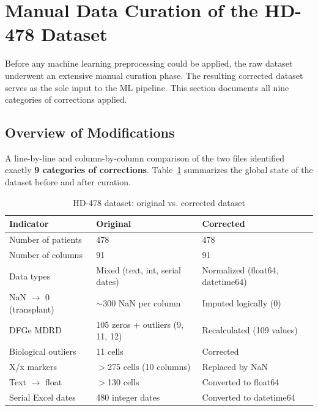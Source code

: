 \documentclass[12pt,a4paper,twoside]{report}
\begin{document}
\section{Manual Data Curation of the HD-478 Dataset}
\label{sec:manual_curation}

Before any machine learning preprocessing could be applied, the raw dataset underwent an extensive manual curation phase. The resulting corrected dataset serves as the sole input to the ML pipeline. This section documents all nine categories of corrections applied.

\subsection{Overview of Modifications}

A line-by-line and column-by-column comparison of the two files identified exactly \textbf{9 categories of corrections}. Table~\ref{tab:preprocess_summary} summarizes the global state of the dataset before and after curation.

\begin{table}[htbp]
\centering
\caption{HD-478 dataset: original vs. corrected dataset}
\label{tab:preprocess_summary}
\begin{tabularx}{\textwidth}{p{4.5cm}Xp{4cm}}
\toprule
\textbf{Indicator} & \textbf{Original} & \textbf{Corrected} \\
\midrule
Number of patients         & 478                                & 478 \\
Number of columns          & 91                                 & 91 \\
Data types                 & Mixed (text, int, serial dates)    & Normalized (float64, datetime64) \\
NaN $\to$ 0 (transplant)   & $\sim$300 NaN per column           & Imputed logically (0) \\
DFGe MDRD                  & 105 zeros + outliers (9, 11, 12)  & Recalculated (109 values) \\
Biological outliers        & 11 cells                           & Corrected \\
X/x markers                & $>$275 cells (10 columns)          & Replaced by NaN \\
Text $\to$ float           & $>$130 cells                       & Converted to float64 \\
Serial Excel dates         & 480 integer dates                  & Converted to datetime64 \\
\bottomrule
\end{tabularx}
\end{table}
\end{document}
